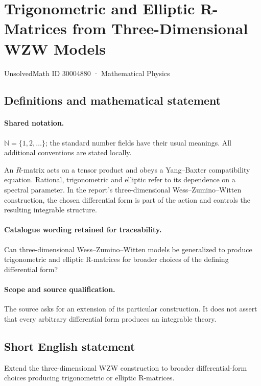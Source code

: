 \documentclass[11pt]{article}
\begin{document}
\setcounter{section}{30004879}
\section{Trigonometric and Elliptic R-Matrices from Three-Dimensional WZW Models}\label{30004880}
{\small UnsolvedMath ID 30004880 · Mathematical Physics}
\subsection{Definitions and mathematical statement}

\paragraph{Shared notation.}$\mathbb N=\{1,2,\ldots\}$; the standard number fields have their usual meanings. All additional conventions are stated locally.


An $R$-matrix acts on a tensor product and obeys a Yang--Baxter compatibility equation. Rational, trigonometric and elliptic refer to its dependence on a spectral parameter. In the report's three-dimensional Wess--Zumino--Witten construction, the chosen differential form is part of the action and controls the resulting integrable structure.

\paragraph{Catalogue wording retained for traceability.}
Can three-dimensional Wess–Zumino–Witten models be generalized to produce trigonometric and elliptic R-matrices for broader choices of the defining differential form?

\paragraph{Scope and source qualification.}The source asks for an extension of its particular construction. It does not assert that every arbitrary differential form produces an integrable theory.
\subsection{Short English statement}
Extend the three-dimensional WZW construction to broader differential-form choices producing trigonometric or elliptic R-matrices.
\end{document}
